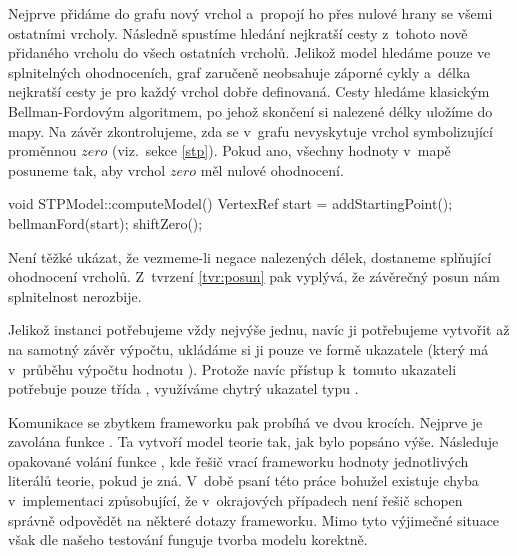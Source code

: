 Nejprve přidáme do grafu nový vrchol a~propojí ho přes nulové hrany se všemi ostatními vrcholy. Následně spustíme hledání nejkratší cesty z~tohoto nově přidaného vrcholu do všech ostatních vrcholů. Jelikož model hledáme pouze ve splnitelných ohodnoceních, graf zaručeně neobsahuje záporné cykly a~délka nejkratší cesty je pro každý vrchol dobře definovaná. Cesty hledáme klasickým Bellman-Fordovým algoritmem, po jehož skončení si nalezené délky uložíme do mapy. Na závěr zkontrolujeme, zda se v~grafu nevyskytuje vrchol symbolizující proměnnou $zero$ (viz.~sekce \ref{stp}). Pokud ano, všechny hodnoty v~mapě posuneme tak, aby vrchol $zero$ měl nulové ohodnocení.
\begin{code}
void STPModel::computeModel() {
	VertexRef start = addStartingPoint();
	bellmanFord(start);
	shiftZero();
}
\end{code}
Není těžké ukázat, že vezmeme-li negace nalezených délek, dostaneme splňující ohodnocení vrcholů. Z~tvrzení \ref{tvr:posun} pak vyplývá, že závěrečný posun nám splnitelnost nerozbije.

Jelikož instanci  potřebujeme vždy nejvýše jednu, navíc ji potřebujeme vytvořit až na samotný závěr výpočtu, ukládáme si ji pouze ve formě ukazatele (který má v~průběhu výpočtu hodnotu ). Protože navíc přístup k~tomuto ukazateli potřebuje pouze třída , využíváme chytrý ukazatel typu .

Komunikace se zbytkem frameworku pak probíhá ve dvou krocích. Nejprve je zavolána funkce . Ta vytvoří model teorie tak, jak bylo popsáno výše. Následuje opakované volání funkce , kde řešič vrací frameworku hodnoty jednotlivých literálů teorie, pokud je zná. V~době psaní této práce bohužel existuje chyba v~implementaci  způsobující, že v~okrajových případech není řešič schopen správně odpovědět na některé dotazy frameworku. Mimo tyto výjimečné situace však dle našeho testování funguje tvorba modelu korektně.
